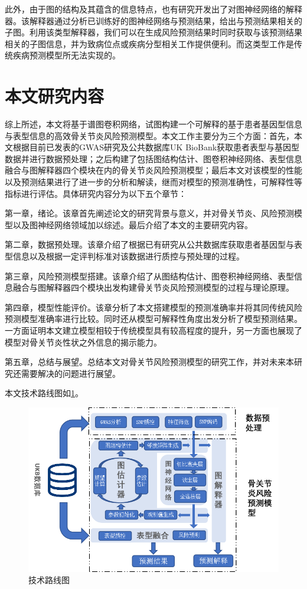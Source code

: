此外，由于图的结构及其蕴含的信息特点，也有研究\cite{ying_gnnexplainer:_2019}开发出了对图神经网络的解释器。该解释器通过分析已训练好的图神经网络与预测结果，给出与预测结果相关的子图。利用该类型解释器，我们可以在生成风险预测结果时同时获取与该预测结果相关的子图信息，并为致病位点或疾病分型相关工作提供便利。而这类型工作是传统疾病预测模型所无法实现的。

\section{本文研究内容}
综上所述，本文将基于谱图卷积网络，试图构建一个可解释的基于患者基因型信息与表型信息的高效骨关节炎风险预测模型。本文工作主要分为三个方面：首先，本文根据目前已发表的GWAS研究及公共数据库UK BioBank获取患者表型与基因型数据并进行数据预处理；之后构建了包括图结构估计、图卷积神经网络、表型信息融合与图解释器四个模块在内的骨关节炎风险预测模型；最后本文对该模型的性能以及预测结果进行了进一步的分析和解读，继而对模型的预测准确性，可解释性等指标进行评估。具体研究内容分为以下五个章节：

第一章，绪论。该章首先阐述论文的研究背景与意义，并对骨关节炎、风险预测模型以及图神经网络领域加以综述。最后介绍了本文的主要研究内容。

第二章，数据预处理。该章介绍了根据已有研究从公共数据库获取患者基因型与表型信息以及根据一定评判标准对该数据进行质控与预处理的过程。

第三章，风险预测模型搭建。该章介绍了从图结构估计、图卷积神经网络、表型信息融合与图解释器四个模块出发构建骨关节炎风险预测模型的过程与理论原理。

第四章，模型性能评价。该章分析了本文搭建模型的预测准确率并将其同传统风险预测模型准确率进行比较。同时还从模型可解释性角度出发分析了模型预测结果。一方面证明本文建立模型相较于传统模型具有较高程度的提升，另一方面也展现了模型对骨关节炎性状之外信息的揭示能力。

第五章，总结与展望。总结本文对骨关节风险预测模型的研究工作，并对未来本研究还需要解决的问题进行展望。

本文技术路线图如\ref{fig:Routine}。
\begin{figure}[!ht]
	\centering
	\includegraphics[width=\textwidth]{./figures/Chapter1/Routine.png}
	\caption{技术路线图} \label{fig:Routine}
\end{figure}